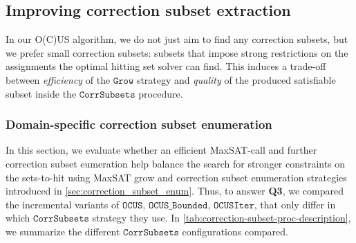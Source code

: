 \documentclass[a4paper,UKenglish,cleveref, autoref, thm-restate, pdfa]{lipics-v2021}
\newcommand\mm[1]{\ensuremath{#1}\xspace}
\newcommand\call[1]{\mm{\texttt{#1}}}
\newcommand\grow{\mm{\call{Grow}}}
\newcommand\comus{\mm{\call{OCUS}}}
\newcommand\ousb{\mm{\call{OCUS\_Bounded}}}
\newcommand\ousbiter{\mm{\call{OCUSIter}}}
\newcommand\corrsubsets{\mm{\call{CorrSubsets}}}
\newcommand\maxsat{MaxSAT\xspace}
\begin{document}
			\subsection{Improving correction subset extraction}
			
			In our O(C)US algorithm, we do not just aim to find any correction subsets, but we prefer small correction subsets: subsets that impose strong restrictions on the assignments the optimal hitting set solver can find. 
			This induces a trade-off between \emph{efficiency} of the \grow strategy and \emph{quality} of the produced satisfiable subset inside the \corrsubsets procedure.
			
			
			\subsubsection{Domain-specific correction subset enumeration}\label{sec:experiments:domain-specific-grow}
			
			In this section, we evaluate whether an efficient \maxsat-call and further correction subset eumeration help balance the search for stronger constraints on the sets-to-hit using \maxsat grow and correction subset enumeration strategies introduced in \cref{sec:correction_subset_enum}.
			Thus, to answer \textbf{Q3}, we compared the incremental variants of \comus, \ousb, \ousbiter, that only differ in which \corrsubsets strategy they use.  
			In \cref{tab:correction-subset-proc-description}, we summarize the different \corrsubsets configurations compared.
			
\end{document}
